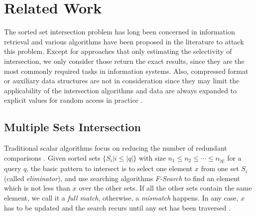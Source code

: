 \documentclass[runningheads,a4paper]{llncs}
\begin{document}
\section{Related Work}\label{sec:related work}
The sorted set intersection problem has long been concerned in information retrieval and various algorithms have been proposed in the literature to attack this problem.
Except for approaches that only estimating the selectivity of intersection, we only consider those return the exact results, since they are the most commonly required tasks in information systems.
Also, compressed format or auxiliary data structures are not in consideration since they may limit the applicability of the intersection algorithms and data are always expanded to explicit values for random access in practice \cite{Culpepper2007Compact,Sanders2007Intersection}.
\subsection{Multiple Sets Intersection}\label{sec: msis}
Traditional scalar algorithms focus on reducing the number of redundant comparisons \cite{Demaine2001Experiments,Barbay2006Faster,Inoue2014Faster,Schlegel2011Fast}.
Given sorted sets $ \{S_i|i\leqslant\lvert q \rvert\} $ with size $ n_1\leqslant n_2\leqslant\cdots\leqslant n_{\lvert q\rvert} $ for a query $ q $, the basic pattern to intersect is to select one element $ x $ from one set $ S_i $ (called \textit{eliminator}), and use searching algorithms \textit{F-Search} to find an element which is not less than $ x $ over the other sets.
If all the other sets contain the same element, we call it a \textit{full match}, otherwise, a \textit{mismatch} happens.
In any case, $ x $ has to be updated and the search recurs until any set has been traversed \cite{culpepper2010efficient}.
\end{document}
